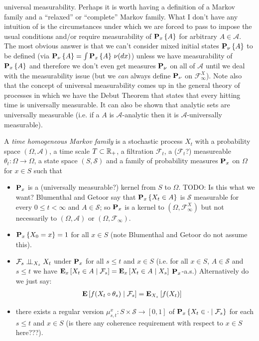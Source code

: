 universal measurability.  Perhaps it is worth having a definition of a Markov family 
and a ``relaxed'' or ``complete'' Markov family.  What I don't have any intuition of 
is the circumstances under which we are forced to pass to impose the usual conditions and/or require measurability of $\sprobability{A}{x}$ for arbitrary $A \in \mathcal{A}$.  
The most obvious answer is that we can't consider mixed initial states $\sprobability{A}{\nu}$ to be defined (via $\sprobability{A}{\nu} = \int \sprobability{A}{x}  \, \nu(dx)$) unless we have measurability of $\sprobability{A}{x}$ and therefore we don't even get measures $\probabilityop_{\nu}$ on all of $\mathcal{A}$ until we deal with the measurability issue (but we \emph{can} always define $\probabilityop_{\nu}$ on $\mathcal{F}^X_\infty$).  Note also that the 
concept of universal measurability comes up in the general theory of processes in which
we have the Debut Theorem that states that every hitting time is universally measurable.  It can also be shown that
analytic sets are universally measurable (i.e. if a $A$ is $\mathcal{A}$-analytic then it is $\mathcal{A}$-universally measurable).

\begin{defn}\label{MarkovFamilyDefn}
A \emph{time homogeneous Markov family} is a stochastic process $X_t$ with a
probability space $(\Omega, \mathcal{A})$, a time scale $T
\subset \reals_+$, a filtration $\mathcal{F}_t$, a ($\mathcal{F}_t$?) measureable $\theta_t : \Omega \to \Omega$, a state space $(S, \mathcal{S})$ and a family of
probability measures $\probabilityop_x$ on $\Omega$ for $x \in S$ such that 
\begin{itemize}
\item[(i)]$\probabilityop_x$ is a (universally measurable?) kernel
  from $S$ to $\Omega$.  TODO: Is this what we want?  Blumenthal and Getoor say that $\sprobability{X_t \in A}{x}$ is $\mathcal{S}$ measurable for every
$0 \leq t < \infty$ and $A \in \mathcal{S}$; so $\probabilityop_x$ is a kernel to $(\Omega, \mathcal{F}^X_\infty)$ but not necessarily to $(\Omega, \mathcal{A})$ or 
$(\Omega, \mathcal{F}_\infty)$.
\item[(ii)]$\sprobability{X_0 = x}{x} = 1$ for all $x \in S$ (note Blumenthal and Getoor do not assume this).
\item[(iii)]$\cindependent{\mathcal{F}_s}{X_t}{X_s}$ under
  $\probabilityop_x$ for all $s \leq
  t$ and $x \in S$ (i.e. for all $x \in S$, $A \in \mathcal{S}$ and $s \leq t$ we have
  $\csexpectationlong{\mathcal{F}_s}{X_t \in A}{x} =
  \csexpectationlong{X_s}{X_t \in A}{x}$ $\probabilityop_x$-a.s.)  Alternatively do we just say:
\begin{align*}
\cexpectationlong{\mathcal{F}_s}{f (X_t \circ \theta_s)} &= \sexpectation{f(X_t)}{X_s}
\end{align*}
\item[(iv)]there exists a regular version $\mu^x_{s,t} :
  S \times \mathcal{S} \to [0,1]$ of $\csprobability{\mathcal{F}_s}{X_t
    \in \cdot}{x}$ for each $s \leq t$ and $x \in S$ (is there any coherence
  requirement with respect to $x \in S$ here???).
\end{itemize}
\end{defn}

